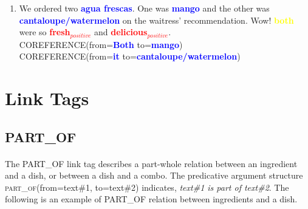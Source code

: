 \documentclass{article}
\begin{document}
\begin{enumerate}[resume]
	\item We ordered two \textbf{\textcolor{blue}{agua frescas}}. One was  \textbf{\textcolor{blue}{mango}} and the other was 
	\textbf{\textcolor{blue}{cantaloupe/watermelon}} on the waitress' recommendation. Wow! 
	\textbf{\textcolor{yellow}{both}} were so 
	\textbf{\textcolor{red}{fresh$_{positive}$}} and 
	\textbf{\textcolor{red}{delicious$_{positive}$}}.\\
		\textsc{COREFERENCE}(from=\textbf{\textcolor{blue}{Both}} to=\textbf{\textcolor{blue}{mango}}) \\
		\textsc{COREFERENCE}(from=\textbf{\textcolor{blue}{it}} to=\textbf{\textcolor{blue}{cantaloupe/watermelon}}) \\
	
\end{enumerate}

\newpage
\section{Link Tags}


\subsection{PART\_OF}
\paragraph{}
The PART\_OF link tag describes a part-whole relation between an ingredient and a dish, or between a dish and a combo. The predicative argument structure \textsc{part\_of}(from=text\#1, to=text\#2) indicates, \textit{text\#1 is part of text\#2}. The following is an example of PART\_OF relation between ingredients and a dish.
\end{document}
